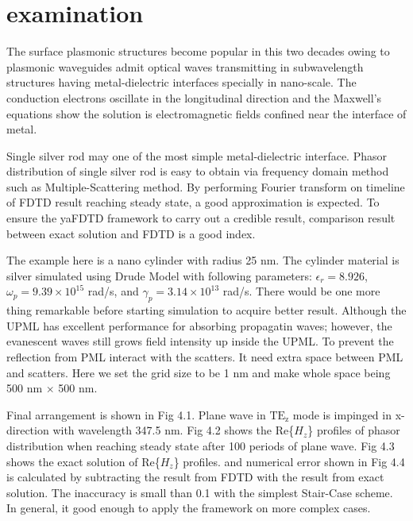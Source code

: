 \section{examination}
The surface plasmonic structures become popular in this two decades owing to plasmonic waveguides admit optical waves
transmitting in subwavelength structures having metal-dielectric interfaces specially in nano-scale. The conduction
electrons oscillate in the longitudinal direction and the Maxwell's equations show the solution is electromagnetic
fields confined near the interface of metal.

Single silver rod may one of the most simple metal-dielectric interface. Phasor distribution of single silver rod is
easy to obtain via frequency domain method such as Multiple-Scattering method. By performing Fourier transform on
timeline of FDTD result reaching steady state, a good approximation is expected. To ensure the yaFDTD framework to carry
out a credible result, comparison result between exact solution and FDTD is a good index.

The example here is a nano cylinder with radius 25 nm. The cylinder material is silver simulated using Drude Model
with following parameters: $\epsilon_r = 8.926$, $\omega_p = 9.39 \times 10^{15}$ rad/s, and $\gamma_p = 3.14 \times
10^{13}$ rad/s.  There would be one more thing remarkable before starting simulation to acquire better result. Although
the UPML has excellent performance for absorbing propagatin waves; however, the evanescent waves still grows field
intensity up inside the UPML. To prevent the reflection from PML interact with the scatters. It need extra space between
PML and scatters. Here we set the grid size to be 1 nm and make whole space being 500 nm $\times$ 500 nm.

Final arrangement is shown in Fig 4.1. Plane wave in $\mathrm{TE_z}$ mode is impinged in x-direction with wavelength
347.5 nm. Fig 4.2 shows the Re\{$H_z$\} profiles of phasor distribution when reaching steady state after 100 periods of
plane wave. Fig 4.3 shows the exact solution of Re\{$H_z$\} profiles. and numerical error shown in Fig 4.4 is calculated
by subtracting the result from FDTD with the result from exact solution. The inaccuracy is small than 0.1 with the
simplest Stair-Case scheme. In general, it good enough to apply the framework on more complex cases.
